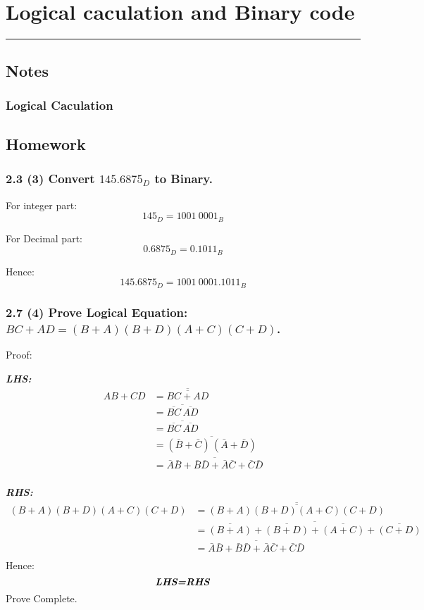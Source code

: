 \section{Logical caculation and Binary code}
\vspace{-15pt}\noindent\rule{\textwidth}{0.1pt}\vspace{-10pt}
    \subsection{Notes}
    \subsubsection*{Logical Caculation}
    \subsection{Homework}
    \subsubsection{2.3 (3) \textnormal{Convert $145.6875_D$ to Binary}.}
    {\color{hwSolution}
        For integer part: \[145_D = 1001~0001_B\]

        For Decimal part: \[0.6875_D = 0.1011_B\]

        Hence:            \[145.6875_D = 1001~0001.1011_B\]
    }
    \subsubsection{2.7 (4) \textnormal{Prove Logical Equation: $BC+AD=(B+A)(B+D)(A+C)(C+D)$}.} 
    {\color{hwSolution}
        \noindent Proof:

        \textbf{\textit{LHS:}}
        \begin{align*}
            AB+CD &= \overline{\overline{BC+AD}}\\
            &= \overline{\overline{BC}\,\overline{AD}}\\
            &= \overline{\overline{BC}\,\overline{AD}}\\
            &= \overline{(\bar{B}+\bar{C})\,(\bar{A}+\bar{D})}\\
            &= \overline{\bar{A}\bar{B}+\bar{B}\bar{D}+\bar{A}\bar{C}+\bar{C}\bar{D}}\\
        \end{align*}

        \textbf{\textit{RHS:}}
        \begin{align*}
            (B+A)(B+D)(A+C)(C+D) &= \overline{\overline{(B+A)(B+D)(A+C)(C+D)}}\\
            &= \overline{\overline{(B+A)}+\overline{(B+D)}+\overline{(A+C)}+\overline{(C+D)}}\\
            &= \overline{\bar{A}\bar{B}+\bar{B}\bar{D}+\bar{A}\bar{C}+\bar{C}\bar{D}}\\
        \end{align*}
        Hence:
        \[\textbf{\textit{LHS=RHS}}\]
        Prove Complete.
    }
